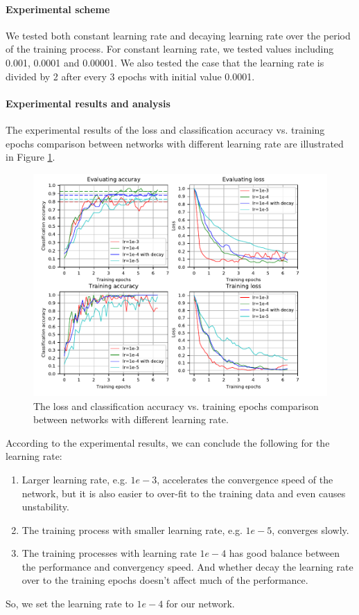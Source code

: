 \paragraph{Experimental scheme}
We tested both constant learning rate and decaying learning rate over the period of the training process.  For constant learning rate, we tested values including 0.001, 0.0001 and 0.00001. We also tested the case that the learning rate is divided by 2 after every 3 epochs with initial value 0.0001.
 
\paragraph{Experimental results and analysis}
The experimental results of the loss and classification accuracy vs. training epochs comparison between networks with different learning rate are illustrated in Figure \ref{fig:plot_lr}.
 \begin{figure}
	\includegraphics[trim=0cm 0cm 0cm 0cm]{fig01/plot_lr.pdf}
	\caption{The loss and classification accuracy vs. training epochs comparison between networks with different learning rate.}
	\label{fig:plot_lr}
\end{figure}
According to the experimental results, we can conclude the following for the learning rate:
\begin{enumerate}
	\item Larger learning rate, e.g. \(1e-3\), accelerates the convergence speed of the network, but it is also easier to over-fit to the training data and even causes unstability.
	\item The training process with smaller learning rate, e.g. \(1e-5\), converges slowly. 
	\item The training processes with learning rate \(1e-4\) has good balance between the performance and convergency speed. And whether decay the learning rate over to the training epochs doesn't affect much of the performance.   
\end{enumerate}
So, we set the learning rate to \(1e-4\) for our network.

